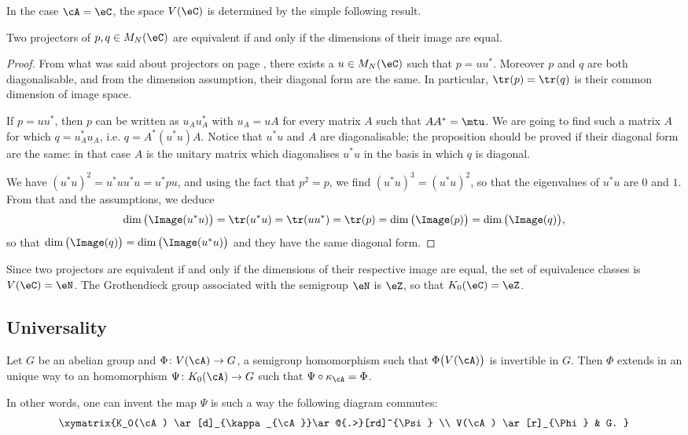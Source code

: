 In the case $\cA=\eC$, the space $V(\eC)$ is determined by the simple following result.
\begin{proposition}
Two projectors of $p,q\in M_N(\eC)$ are equivalent if and only if the dimensions of their image are equal.
\end{proposition}

\begin{proof}
From what was said about projectors on page \pageref{PgProjPositif} , there exists a $u\in M_N(\eC)$ such that $p=uu^*$. Moreover $p$ and $q$ are both diagonalisable, and from the dimension assumption, their diagonal form are the same. In particular, $\tr(p)=\tr(q)$ is their common dimension of image space.

If $p=uu^*$, then $p$ can be written as $u_Au_A^*$ with $u_A=uA$ for every matrix $A$ such that $AA^*=\mtu$. We are going to find such a matrix $A$ for which $q=u_A^*u_A$, i.e. $q=A^*(u^*u)A$. Notice that $u^*u$ and $A$ are diagonalisable; the proposition should be proved if their diagonal form are the same: in that case $A$ is the unitary matrix which diagonalises $u^*u$ in the basis in which $q$ is diagonal.

We have $(u^*u)^2=u^*uu^*u=u^*pu$, and using the fact that $p^2=p$, we find $(u^*u)^3=(u^*u)^2$, so that the eigenvalues of $u^*u$ are $0$ and $1$. From that and the assumptions, we deduce
\[
  \dim\big( \Image(u^*u) \big)=\tr(u^*u)=\tr(uu^*)=\tr(p)=\dim\big( \Image(p) \big)=\dim\big( \Image(q) \big),
\]
so that $\dim\big( \Image(q) \big)=\dim\big( \Image(u^*u)\big)$ and they have the same diagonal form.
\end{proof}

Since two projectors are equivalent if and only if the dimensions of their respective image are equal, the set of equivalence classes is $V(\eC)=\eN$. The Grothendieck group associated with the semigroup $\eN$ is $\eZ$, so that $K_0(\eC)=\eZ$.

\subsection{Universality}

\begin{proposition}
Let $G$ be an abelian group and $\Phi\colon V(\cA)\to G$, a semigroup homomorphism such that $\Phi\big( V(\cA) \big)$ is invertible in $G$. Then $\Phi$ extends in an unique way to an homomorphism $\Psi\colon K_0(\cA)\to G$ such that $\Psi\circ\kappa_{\cA}=\Phi$.
\end{proposition}
In other words, one can invent the map $\Psi$ is such a way the following diagram commutes:
\[
\xymatrix{%
   K_0(\cA) \ar[d]_{\kappa_{\cA}}\ar@{.>}[rd]^{\Psi}		\\
   V(\cA) \ar[r]_{\Phi}	&	G.
}
\]

